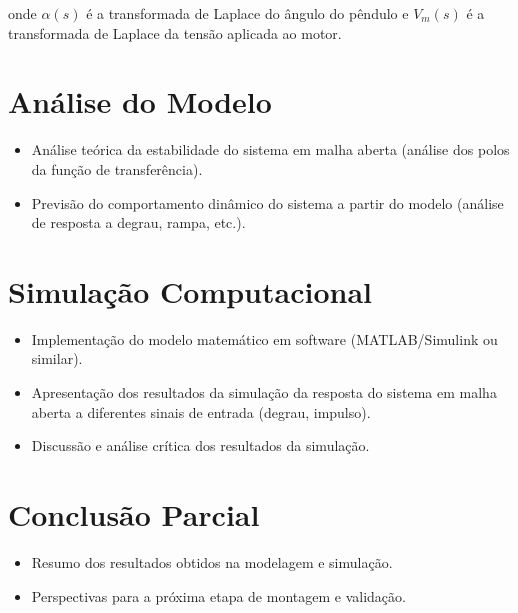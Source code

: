 \documentclass[9pt,a4paper,twocolumn,twoside]{tau-class/tau}
\begin{document}
onde $\alpha(s)$ é a transformada de Laplace do ângulo do pêndulo e $V_m(s)$ é a 
transformada de Laplace da tensão aplicada ao motor.




\section{Análise do Modelo}
\begin{itemize}
    \item Análise teórica da estabilidade do sistema em malha aberta (análise dos polos da função de transferência).
    \item Previsão do comportamento dinâmico do sistema a partir do modelo (análise de resposta a degrau, rampa, etc.).
\end{itemize}

\section{Simulação Computacional}
\begin{itemize}
    \item Implementação do modelo matemático em software (MATLAB/Simulink ou similar).
    \item Apresentação dos resultados da simulação da resposta do sistema em malha aberta a diferentes sinais de entrada (degrau, impulso).
    \item Discussão e análise crítica dos resultados da simulação.
\end{itemize}

\section{Conclusão Parcial}
\begin{itemize}
    \item Resumo dos resultados obtidos na modelagem e simulação.
    \item Perspectivas para a próxima etapa de montagem e validação.
\end{itemize}


    
    
\end{document}

